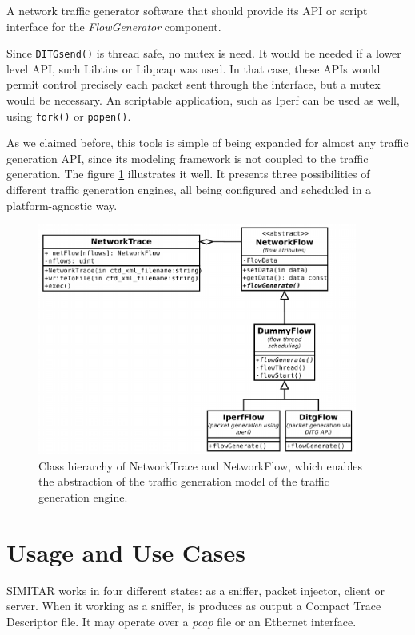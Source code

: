 A network traffic generator software that should provide its API or script interface for the \textit{FlowGenerator} component. 
 
Since \texttt{DITGsend()} is thread safe, no mutex is need. It would be needed if a lower level API, such Libtins or Libpcap was used. In that case, these APIs would permit control precisely each packet sent through the interface, but a mutex would be necessary. An scriptable application, such as Iperf can be used as well, using \texttt{fork()} or \texttt{popen()}.

As we claimed before, this tools is simple of being expanded for almost any traffic generation API, since its modeling framework is not coupled to the traffic generation.
The figure \ref{fig:network-trace-flow-class-diagram} illustrates it well. It presents three possibilities of different traffic generation engines, all being configured and scheduled in a platform-agnostic way.

\begin{figure}[ht!]
    \centering
    \includegraphics[height=3.0in]{figures/ch3/trace-flow}
    \caption{Class hierarchy of NetworkTrace and NetworkFlow, which enables the abstraction of the traffic generation model of the traffic generation engine.}
    \label{fig:network-trace-flow-class-diagram}
\end{figure}


\section{Usage and Use Cases}

SIMITAR works in four different states: as a sniffer, packet injector, client or server. 
When it working as a sniffer, is produces as output a Compact Trace Descriptor file. It may operate over a \textit{pcap} file or an Ethernet interface.

